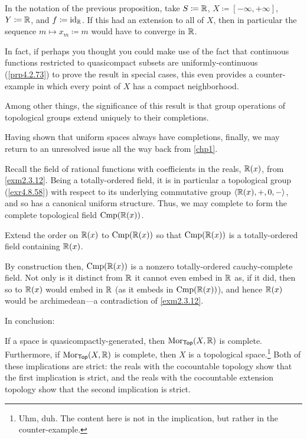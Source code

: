 \begin{exm}\label{exm4.5.20x}
In the notation of the previous proposition, take $S\coloneqq \mathbb{R}$, $X\coloneqq [-\infty ,+\infty]$, $Y\coloneqq \mathbb{R}$, and $f\coloneqq \operatorname{id} _{\mathbb{R}}$.  If this had an extension to all of $X$, then in particular the sequence $m\mapsto x_m\coloneqq m$ would have to converge in $\mathbb{R}$.
\begin{rmk}
In fact, if perhaps you thought you could make use of the fact that continuous functions restricted to quasicompact subsets are uniformly-continuous (\cref{prp4.2.73}) to prove the result in special cases, this even provides a counter-example in which every point of $X$ has a compact neighborhood.
\end{rmk}
\end{exm}
Among other things, the significance of this result is that group operations of topological groups extend uniquely to their completions.

Having shown that uniform spaces always have completions, finally, we may return to an unresolved issue all the way back from \cref{chp1}.
\begin{exm}
Recall the field of rational functions with coefficients in the reals, $\mathbb{R} (x)$, from \cref{exm2.3.12}.  Being a totally-ordered field, it is in particular a topological group (\cref{exr4.8.58}) with respect to its underlying commutative group $\langle\mathbb{R} (x),+,0,-\rangle$, and so has a canonical uniform structure.  Thus, we may complete to form the complete topological field $\operatorname{Cmp} (\mathbb{R} (x))$.
\begin{exr}
Extend the order on $\mathbb{R} (x)$ to $\operatorname{Cmp} (\mathbb{R} (x))$ so that $\operatorname{Cmp} (\mathbb{R} (x))$ is a totally-ordered field containing $\mathbb{R} (x)$.
\end{exr}
By construction then, $\operatorname{Cmp} (\mathbb{R} (x))$ is a nonzero totally-ordered cauchy-complete field.  Not only is it distinct from $\mathbb{R}$ it cannot even embed in $\mathbb{R}$ as, if it did, then so to $\mathbb{R} (x)$ would embed in $\mathbb{R}$ (as it embeds in $\operatorname{Cmp} (\mathbb{R} (x))$), and hence $\mathbb{R} (x)$ would be archimedean---a contradiction of \cref{exm2.3.12}.
\end{exm}

In conclusion:
\begin{footnoteequation}
\begin{textequation}
If a space is quasicompactly-generated, then $\operatorname{Mor} _{\mathsf{Top}}(X,\mathbb{R} )$ is complete.  Furthermore, if $\operatorname{Mor} _{\mathsf{Top}}(X,\mathbb{R} )$ is complete, then $X$ is a topological space.\footnote{Uhm, duh.  The content here is not in the implication, but rather in the counter-example.}  Both of these implications are strict:  the reals with the cocountable topology show that the first implication is strict, and the reals with the cocountable extension topology show that the second implication is strict.
\end{textequation}
\end{footnoteequation}

